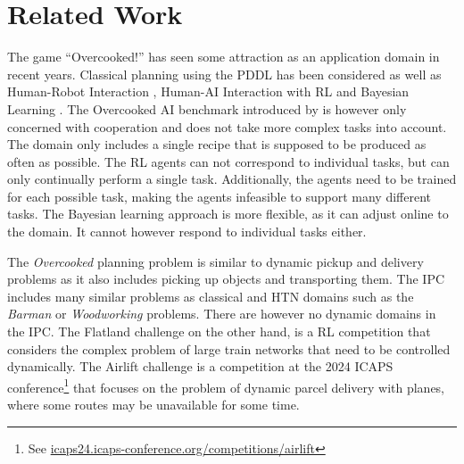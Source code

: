 \section{Related Work}
\label{sec:related-work}

The game ``Overcooked!'' has seen some attraction as an application domain in recent years.
Classical planning using the \ac{PDDL} has been considered \citep{yuxinliuPlanningOvercookedGame2020} as well as Human-Robot Interaction \citep{bishopCHAOPTTestbedEvaluating2020,roseroTwoManyCooks2021}, Human-\ac{AI} Interaction with \ac{RL} \citep{carrollUtilityLearningHumans2019,charakornInvestigatingPartnerDiversification2020,knottEvaluatingRobustnessCollaborative2021,nalepkaInteractionFlexibilityArtificial2021,fontaineImportanceEnvironmentsHumanRobot2021,zhaoMaximumEntropyPopulationbased2023,sarkarPantheonrlMarlLibrary2022,ruhdorferMindsChefsUsing2023} and Bayesian Learning \citep{ribeiroAssistingUnknownTeammates2022}.
The Overcooked \ac{AI} benchmark introduced by \cite{carrollUtilityLearningHumans2019} is however only concerned with cooperation and does not take more complex tasks into account.
The domain only includes a single recipe that is supposed to be produced as often as possible.
The \ac{RL} agents can not correspond to individual tasks, but can only continually perform a single task.
Additionally, the agents need to be trained for each possible task, making the agents infeasible to support many different tasks.
The Bayesian learning approach is more flexible, as it can adjust online to the domain. 
It cannot however respond to individual tasks either.

The \textit{Overcooked} planning problem is similar to dynamic pickup and delivery problems \citep{berbegliaDynamicPickupDelivery2010} as it also includes picking up objects and transporting them.
The \ac{IPC} \citep{taitler2023InternationalPlanning2024} includes many similar problems as classical and \ac{HTN} domains such as the \textit{Barman} or \textit{Woodworking} problems.
There are however no dynamic domains in the \ac{IPC}.
The Flatland challenge \cite{mohantyFlatlandRLMultiAgentReinforcement2020} on the other hand, is a \ac{RL} competition that considers the complex problem of large train networks that need to be controlled dynamically.
The Airlift challenge \citep{bertsimasAirliftPlanningProblem2019} is a competition at the 2024 ICAPS conference\footnote{See \href{https://icaps24.icaps-conference.org/competitions/airlift/}{icaps24.icaps-conference.org/competitions/airlift}} that focuses on the problem of dynamic parcel delivery with planes, where some routes may be unavailable for some time.

